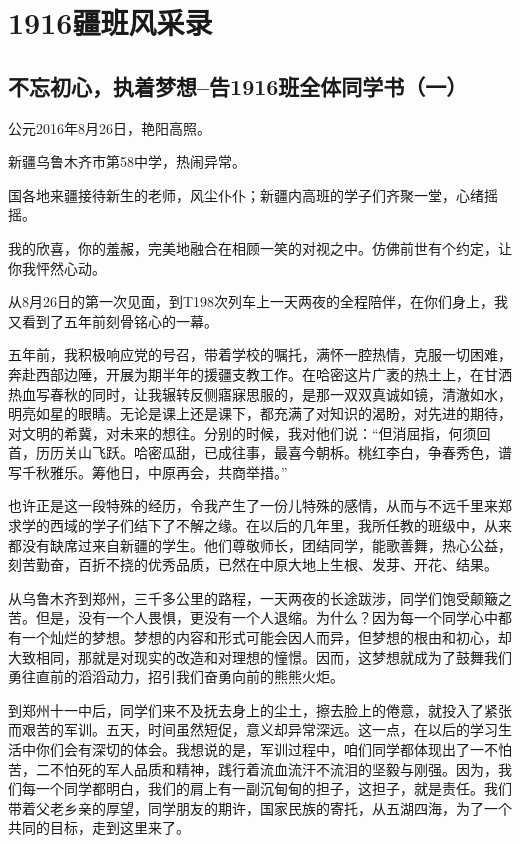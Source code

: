\documentclass[openany]{ctexbook}
\begin{document}
\part{1916疆班风采录}\label{part-1916}

\chapter*{不忘初心，执着梦想--告1916班全体同学书（一）}\label{letter1}

公元2016年8月26日，艳阳高照。

新疆乌鲁木齐市第58中学，热闹异常。

国各地来疆接待新生的老师，风尘仆仆；新疆内高班的学子们齐聚一堂，心绪摇摇。

我的欣喜，你的羞赧，完美地融合在相顾一笑的对视之中。仿佛前世有个约定，让你我怦然心动。

从8月26日的第一次见面，到T198次列车上一天两夜的全程陪伴，在你们身上，我又看到了五年前刻骨铭心的一幕。

五年前，我积极响应党的号召，带着学校的嘱托，满怀一腔热情，克服一切困难，奔赴西部边陲，开展为期半年的援疆支教工作。在哈密这片广袤的热土上，在甘洒热血写春秋的同时，让我辗转反侧寤寐思服的，是那一双双真诚如镜，清澈如水，明亮如星的眼睛。无论是课上还是课下，都充满了对知识的渴盼，对先进的期待，对文明的希冀，对未来的想往。分别的时候，我对他们说：``但消屈指，何须回首，历历关山飞跃。哈密瓜甜，已成往事，最喜今朝柝。桃红李白，争春秀色，谱写千秋雅乐。筹他日，中原再会，共商举措。''

也许正是这一段特殊的经历，令我产生了一份儿特殊的感情，从而与不远千里来郑求学的西域的学子们结下了不解之缘。在以后的几年里，我所任教的班级中，从来都没有缺席过来自新疆的学生。他们尊敬师长，团结同学，能歌善舞，热心公益，刻苦勤奋，百折不挠的优秀品质，已然在中原大地上生根、发芽、开花、结果。

从乌鲁木齐到郑州，三千多公里的路程，一天两夜的长途跋涉，同学们饱受颠簸之苦。但是，没有一个人畏惧，更没有一个人退缩。为什么？因为每一个同学心中都有一个灿烂的梦想。梦想的内容和形式可能会因人而异，但梦想的根由和初心，却大致相同，那就是对现实的改造和对理想的憧憬。因而，这梦想就成为了鼓舞我们勇往直前的滔滔动力，招引我们奋勇向前的熊熊火炬。

到郑州十一中后，同学们来不及抚去身上的尘土，擦去脸上的倦意，就投入了紧张而艰苦的军训。五天，时间虽然短促，意义却异常深远。这一点，在以后的学习生活中你们会有深切的体会。我想说的是，军训过程中，咱们同学都体现出了一不怕苦，二不怕死的军人品质和精神，践行着流血流汗不流泪的坚毅与刚强。因为，我们每一个同学都明白，我们的肩上有一副沉甸甸的担子，这担子，就是责任。我们带着父老乡亲的厚望，同学朋友的期许，国家民族的寄托，从五湖四海，为了一个共同的目标，走到这里来了。
\end{document}

